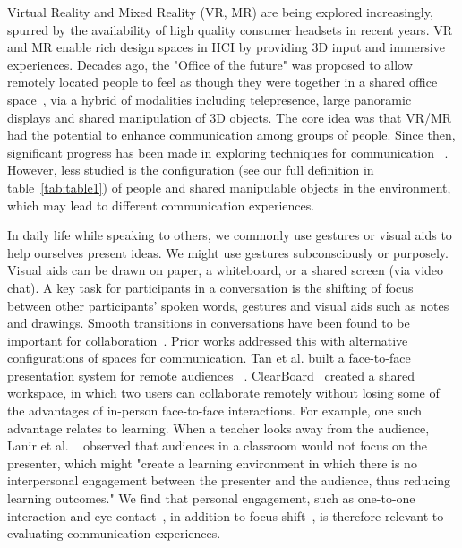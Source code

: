 \documentclass[sigchi-a]{acmart}
\begin{document}
Virtual Reality and Mixed Reality (VR, MR) are being explored increasingly, spurred by the availability of high quality consumer headsets in recent years. VR and MR enable rich design spaces in HCI by providing 3D input and immersive experiences. Decades ago, the "Office of the future" was proposed to allow remotely located people to feel as though they were together in a shared office space~\cite{raskar1998office}, via a hybrid of modalities including telepresence, large panoramic displays and shared manipulation of 3D objects. The core idea was that VR/MR had the potential to enhance communication among groups of people. Since then, significant progress has been made in exploring techniques for communication ~\cite{ishii1993integration, otsuka2016mmspace}. However, less studied is the configuration (see our full definition in table~\ref{tab:table1}) of people and shared manipulable objects in the environment, which may lead to different communication experiences.

In daily life while speaking to others, we commonly use gestures or visual aids to help ourselves present ideas. We might use gestures subconsciously or purposely. Visual aids can be drawn on paper, a whiteboard, or a shared screen (via video chat). A key task for participants in a conversation is the shifting of focus between other participants' spoken words, gestures and visual aids such as notes and drawings. Smooth transitions in conversations have been found to be important for collaboration~\cite{buxton1992telepresence}.
Prior works addressed this with alternative configurations of spaces for communication. Tan et al. built a face-to-face presentation system for remote audiences ~\cite{gazeAwareness}. ClearBoard~\cite{ishii1993integration} created a shared workspace, in which two users can collaborate remotely without losing some of the advantages of in-person face-to-face interactions. For example, one such advantage relates to learning. When a teacher looks away from the audience, Lanir et al. ~\cite{Lanir2008ClassroomPresentationSoftware} observed that audiences in a classroom would not focus on the presenter, which might "create a learning environment in which there is no interpersonal engagement between the presenter and the audience, thus reducing learning outcomes." 
We find that personal engagement, such as one-to-one interaction and eye contact~\cite{InsaPositionInClassroom}, in addition to focus shift~\cite{buxton1992telepresence}, is therefore relevant to evaluating communication experiences.
\end{document}
